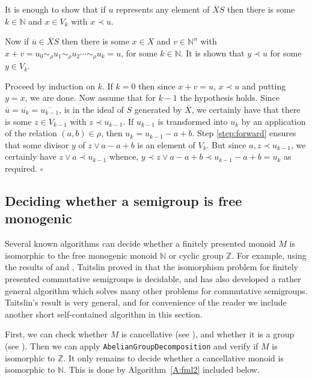 \documentclass[12pt]{article}
\newenvironment{proof}{{\it Proof.\/}}{$\square$\\}
\begin{document}
\begin{proof}
It is enough to show that if $u$ represents any element of
$\overline{X}S$ then there is some $k \in \mathbb{N}$ and
$x \in V_k$ with $x \prec u$. 

Now if $\overline{u} \in \overline{X}S$ then there is some
$x \in X$ and $v \in \mathbb{N}^n$ with
$x + v = u_0 \sim_\rho u_1 \sim_\rho u_2 \cdots \sim_\rho u_k = u$, for
some $k \in \mathbb{N}$. It is shown that $y \prec u$ for some
$y \in V_k$. 

Proceed by induction on $k$. If $k = 0$ then since
$x + v = u$, $x \prec u$ and putting $y = x$, we are done.
Now assume that for $k - 1$ the hypothesis holds.
Since $\overline{u} = \overline{u_k} = \overline{u_{k-1}}$,
is in the ideal of $S$ generated by $\overline{X}$, we certainly have
that there is some $z \in V_{k-1}$ with $z \prec u_{k-1}$.
If $u_{k-1}$ is transformed into $u_k$ by an application of the
relation $(a,b) \in \rho$, then $u_k = u_{k-1} - a + b$.
Step \ref{step:forward} ensures that  some divisor $y$ of  
$z \vee a -a + b$ is an element of $V_k$.
But since $a,z \prec  u_{k-1}$, we certainly have 
$z \vee a \prec u_{k-1}$ whence, 
$y \prec z \vee a -a + b \prec u_{k-1} - a + b = u_k$
as required. 
\end{proof}

\subsection{Deciding whether a semigroup is free monogenic}\label{s:freemon}

Several known algorithms can decide whether a finitely presented
monoid $M$ is isomorphic to the free monogenic monoid 
$\mathbb{N}$ or cyclic group $\mathbb{Z}$. 
For example, using the results of \cite{p2} and \cite{p1},
Taitslin proved in \cite{taitslin} that the isomorphism problem
for finitely presented commutative semigroups is decidable, and 
has also developed a rather general algorithm which solves many 
other problems for commutative semigroups. Taitslin's result is 
very general, and for convenience of the reader we include 
another short self-contained algorithm in this section. 

First, we can check whether $M$ is cancellative (see \cite[Chapter 8]{bRG99}), 
and whether it is a group (see \cite{bRG99}). Then we can 
apply {\tt AbelianGroupDecomposition} and verify if $M$ is 
isomorphic to $\mathbb{Z}$. It only remains to decide 
whether a cancellative monoid is isomorphic to $\mathbb{N}$. 
This is done by Algorithm~\ref{A:fml2} included below.
\end{document}
